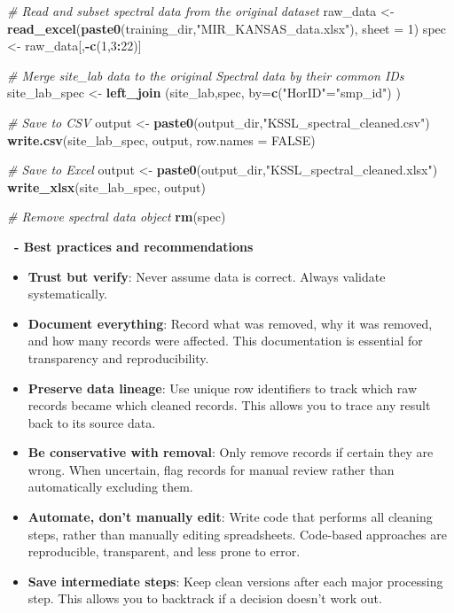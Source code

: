 \documentclass[
  10pt,
  b5paper,
  oneside]{book}
\newenvironment{Shaded}{\begin{snugshade}}{\end{snugshade}}
\newcommand{\AttributeTok}[1]{\textcolor[rgb]{0.13,0.29,0.53}{#1}}
\newcommand{\CommentTok}[1]{\textcolor[rgb]{0.56,0.35,0.01}{\textit{#1}}}
\newcommand{\ConstantTok}[1]{\textcolor[rgb]{0.56,0.35,0.01}{#1}}
\newcommand{\DecValTok}[1]{\textcolor[rgb]{0.00,0.00,0.81}{#1}}
\newcommand{\FunctionTok}[1]{\textcolor[rgb]{0.13,0.29,0.53}{\textbf{#1}}}
\newcommand{\NormalTok}[1]{#1}
\newcommand{\OtherTok}[1]{\textcolor[rgb]{0.56,0.35,0.01}{#1}}
\newcommand{\SpecialCharTok}[1]{\textcolor[rgb]{0.81,0.36,0.00}{\textbf{#1}}}
\newcommand{\StringTok}[1]{\textcolor[rgb]{0.31,0.60,0.02}{#1}}
\begin{document}
\begin{Shaded}
\begin{Highlighting}[]
\CommentTok{\# Read and subset spectral data from the original dataset}
\NormalTok{raw\_data }\OtherTok{\textless{}{-}} \FunctionTok{read\_excel}\NormalTok{(}\FunctionTok{paste0}\NormalTok{(training\_dir,}\StringTok{"MIR\_KANSAS\_data.xlsx"}\NormalTok{), }\AttributeTok{sheet =} \DecValTok{1}\NormalTok{) }
\NormalTok{spec }\OtherTok{\textless{}{-}}\NormalTok{ raw\_data[,}\SpecialCharTok{{-}}\FunctionTok{c}\NormalTok{(}\DecValTok{1}\NormalTok{,}\DecValTok{3}\SpecialCharTok{:}\DecValTok{22}\NormalTok{)]}

\CommentTok{\# Merge site\_lab data to the original Spectral data by their common IDs}
\NormalTok{site\_lab\_spec }\OtherTok{\textless{}{-}} \FunctionTok{left\_join}\NormalTok{ (site\_lab,spec, }\AttributeTok{by=}\FunctionTok{c}\NormalTok{(}\StringTok{"HorID"}\OtherTok{=}\StringTok{"smp\_id"}\NormalTok{) )}

\CommentTok{\# Save to CSV}
\NormalTok{output }\OtherTok{\textless{}{-}} \FunctionTok{paste0}\NormalTok{(output\_dir,}\StringTok{"KSSL\_spectral\_cleaned.csv"}\NormalTok{)}
\FunctionTok{write.csv}\NormalTok{(site\_lab\_spec, output, }\AttributeTok{row.names =} \ConstantTok{FALSE}\NormalTok{)}

\CommentTok{\# Save to Excel}
\NormalTok{output }\OtherTok{\textless{}{-}} \FunctionTok{paste0}\NormalTok{(output\_dir,}\StringTok{"KSSL\_spectral\_cleaned.xlsx"}\NormalTok{)}
\FunctionTok{write\_xlsx}\NormalTok{(site\_lab\_spec, output)}

\CommentTok{\# Remove spectral data object}
\FunctionTok{rm}\NormalTok{(spec)}
\end{Highlighting}
\end{Shaded}

\textbf{~- Best practices and recommendations}

\begin{itemize}
\item
  \textbf{Trust but verify}: Never assume data is correct. Always validate systematically.
\item
  \textbf{Document everything}: Record what was removed, why it was removed, and how many records were affected. This documentation is essential for transparency and reproducibility.
\item
  \textbf{Preserve data lineage}: Use unique row identifiers to track which raw records became which cleaned records. This allows you to trace any result back to its source data.
\item
  \textbf{Be conservative with removal}: Only remove records if certain they are wrong. When uncertain, flag records for manual review rather than automatically excluding them.
\item
  \textbf{Automate, don't manually edit}: Write code that performs all cleaning steps, rather than manually editing spreadsheets. Code-based approaches are reproducible, transparent, and less prone to error.
\item
  \textbf{Save intermediate steps}: Keep clean versions after each major processing step. This allows you to backtrack if a decision doesn't work out.
\end{itemize}
\end{document}
